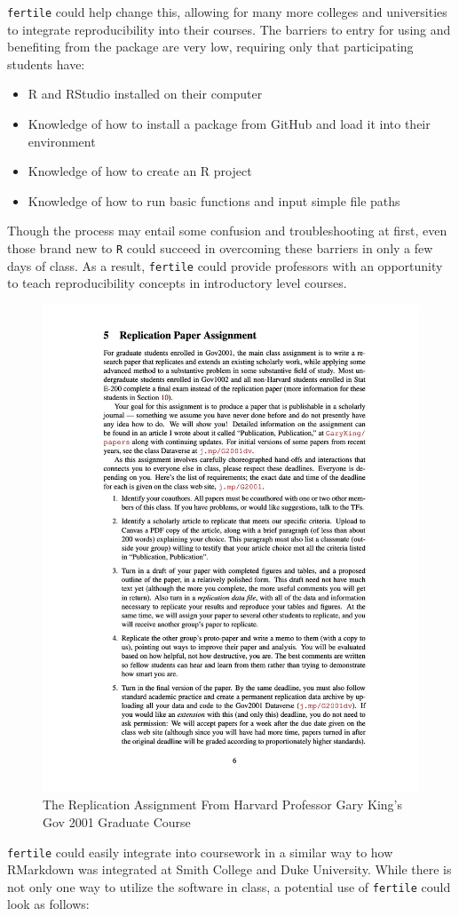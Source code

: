 \documentclass[12pt,twoside]{reedthesis}
\providecommand{\tightlist}{%
  \setlength{\itemsep}{0pt}\setlength{\parskip}{0pt}}
\begin{document}
\texttt{fertile} could help change this, allowing for many more colleges and universities to integrate reproducibility into their courses. The barriers to entry for using and benefiting from the package are very low, requiring only that participating students have:
\begin{itemize}
\tightlist
\item
  R and RStudio installed on their computer
\item
  Knowledge of how to install a package from GitHub and load it into their environment
\item
  Knowledge of how to create an R project
\item
  Knowledge of how to run basic functions and input simple file paths
\end{itemize}
Though the process may entail some confusion and troubleshooting at first, even those brand new to \texttt{R} could succeed in overcoming these barriers in only a few days of class. As a result, \texttt{fertile} could provide professors with an opportunity to teach reproducibility concepts in introductory level courses.
\begin{figure}
\includegraphics[width=1\linewidth]{figure/gov-2001-replication} \caption{The Replication Assignment From Harvard Professor Gary King's Gov 2001 Graduate Course}\label{fig:unnamed-chunk-65}
\end{figure}
\texttt{fertile} could easily integrate into coursework in a similar way to how RMarkdown was integrated at Smith College and Duke University. While there is not only one way to utilize the software in class, a potential use of \texttt{fertile} could look as follows:
\end{document}
